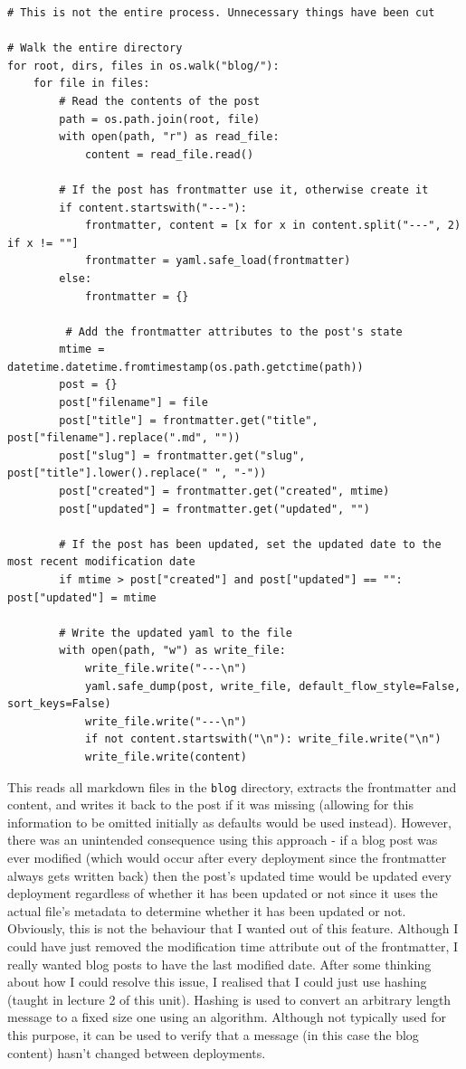 \begin{verbatim}
# This is not the entire process. Unnecessary things have been cut

# Walk the entire directory
for root, dirs, files in os.walk("blog/"):
    for file in files:
        # Read the contents of the post
        path = os.path.join(root, file)
        with open(path, "r") as read_file:
            content = read_file.read()

        # If the post has frontmatter use it, otherwise create it
        if content.startswith("---"):
            frontmatter, content = [x for x in content.split("---", 2) if x != ""]
            frontmatter = yaml.safe_load(frontmatter)
        else:
            frontmatter = {}

         # Add the frontmatter attributes to the post's state
        mtime = datetime.datetime.fromtimestamp(os.path.getctime(path))
        post = {}
        post["filename"] = file
        post["title"] = frontmatter.get("title", post["filename"].replace(".md", ""))
        post["slug"] = frontmatter.get("slug", post["title"].lower().replace(" ", "-"))
        post["created"] = frontmatter.get("created", mtime)
        post["updated"] = frontmatter.get("updated", "")

        # If the post has been updated, set the updated date to the most recent modification date
        if mtime > post["created"] and post["updated"] == "": post["updated"] = mtime

        # Write the updated yaml to the file
        with open(path, "w") as write_file:
            write_file.write("---\n")
            yaml.safe_dump(post, write_file, default_flow_style=False, sort_keys=False)
            write_file.write("---\n")
            if not content.startswith("\n"): write_file.write("\n")
            write_file.write(content)
\end{verbatim}

This reads all markdown files in the \texttt{blog} directory, extracts
the frontmatter and content, and writes it back to the post if it was
missing (allowing for this information to be omitted initially as
defaults would be used instead). However, there was an unintended
consequence using this approach - if a blog post was ever modified
(which would occur after every deployment since the frontmatter always
gets written back) then the post's updated time would be updated every
deployment regardless of whether it has been updated or not since it
uses the actual file's metadata to determine whether it has been updated
or not. Obviously, this is not the behaviour that I wanted out of this
feature. Although I could have just removed the modification time
attribute out of the frontmatter, I really wanted blog posts to have the
last modified date. After some thinking about how I could resolve this
issue, I realised that I could just use hashing (taught in lecture 2 of
this unit). Hashing is used to convert an arbitrary length message to a
fixed size one using an algorithm. Although not typically used for this
purpose, it can be used to verify that a message (in this case the blog
content) hasn't changed between deployments.

